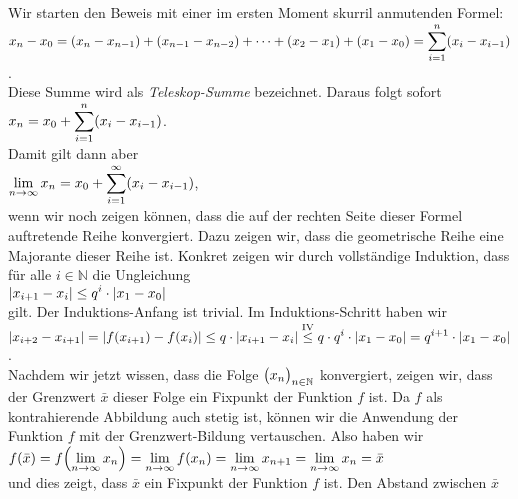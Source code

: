 \proof
Wir starten den Beweis mit einer im
ersten Moment skurril anmutenden Formel: 
\\[0.2cm]
\hspace*{0.8cm}
$\displaystyle x_n - x_0 = (x_n - x_{n-1}) + (x_{n-1} - x_{n-2}) + \cdots + (x_2 - x_1) + (x_1 - x_0) = \sum\limits_{i=1}^n (x_i - x_{i-1})$.
\\[0.2cm]
Diese Summe wird als \emph{Teleskop-Summe} bezeichnet.
Daraus folgt sofort 
\\[0.2cm]
\hspace*{1.3cm}
$\displaystyle x_n = x_0 + \sum\limits_{i=1}^n (x_i - x_{i-1})$.
\\[0.2cm]
Damit gilt dann aber
\\[0.2cm]
\hspace*{1.3cm}
$\displaystyle\lim\limits_{n\rightarrow\infty} x_n = x_0 + \sum\limits_{i=1}^\infty (x_i - x_{i-1})$,
\\[0.2cm]
wenn wir noch zeigen k\"onnen, dass
die auf der rechten Seite dieser Formel auftretende Reihe konvergiert.  Dazu zeigen wir, dass die geometrische Reihe eine Majorante dieser Reihe ist.
Konkret zeigen wir durch vollst\"andige Induktion, dass f\"ur alle $i\in\mathbb{N}$ die Ungleichung
\\[0.2cm]
\hspace*{1.3cm}
$\displaystyle|x_{i+1} - x_i| \leq q^i \cdot |x_1 - x_0|$
\\[0.2cm]
gilt.  Der Induktions-Anfang ist trivial.  Im Induktions-Schritt haben wir
\\[0.2cm]
\hspace*{0.8cm}
$\displaystyle|x_{i+2} - x_{i+1}| = |f(x_{i+1}) - f(x_i)| \leq q \cdot  |x_{i+1} - x_i| \stackrel{\mbox{\scriptsize IV}}{\leq}
q \cdot  q^i \cdot  |x_1 - x_0| = q^{i+1} \cdot  |x_1 - x_0|$.
\\[0.3cm]
Nachdem wir jetzt wissen, dass die Folge $\bigl(x_n\bigr)_{n\in\mathbb{N}}$ konvergiert, zeigen wir, dass der
Grenzwert $\bar{x}$ dieser Folge ein Fixpunkt der Funktion $f$ ist.  Da $f$ als kontrahierende
Abbildung auch stetig ist, k\"onnen wir die Anwendung der Funktion $f$ mit der Grenzwert-Bildung
vertauschen.  Also haben wir 
\\[0.2cm]
\hspace*{1.3cm}
$\displaystyle f(\bar{x}) = f\Bigl(\lim\limits_{n\rightarrow\infty} x_n\Bigr) =
\lim\limits_{n\rightarrow\infty} f(x_n) = \lim\limits_{n\rightarrow\infty} x_{n+1} =
\lim\limits_{n\rightarrow\infty} x_{n} = \bar{x}$
\\[0.2cm]
und dies zeigt, dass $\bar{x}$ ein Fixpunkt der Funktion $f$ ist.  Den Abstand zwischen $\bar{x}$

